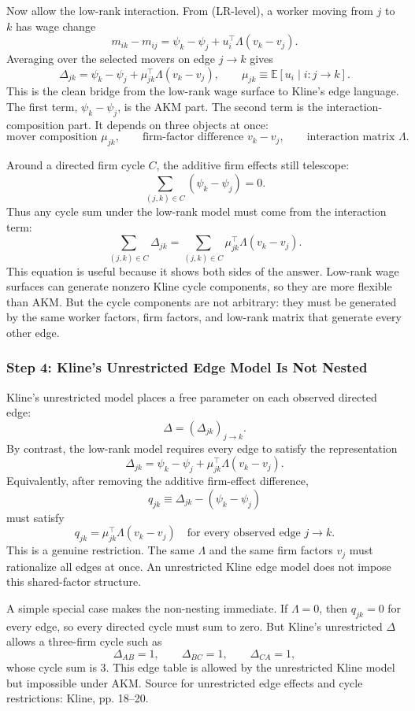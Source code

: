 ﻿\documentclass[11pt]{article}
\newcommand{\E}{\mathbb{E}}
\newcommand{\1}{\mathbf{1}}
\begin{document}
Now allow the low-rank interaction. From (LR-level), a worker moving from $j$ to
$k$ has wage change
\[
m_{ik}-m_{ij}
=
\psi_k-\psi_j+u_i^\top\Lambda(v_k-v_j).
\]
Averaging over the selected movers on edge $j\to k$ gives
\[
\Delta_{jk}
=
\psi_k-\psi_j+\mu_{jk}^\top\Lambda(v_k-v_j),
\qquad
\mu_{jk}\equiv \E[u_i\mid i:j\to k].
\tag{LR-edge}
\]
This is the clean bridge from the low-rank wage surface to Kline's edge language.
The first term, $\psi_k-\psi_j$, is the AKM part. The second term is the
interaction-composition part. It depends on three objects at once:
\[
\text{mover composition } \mu_{jk},
\qquad
\text{firm-factor difference } v_k-v_j,
\qquad
\text{interaction matrix } \Lambda.
\]

Around a directed firm cycle $C$, the additive firm effects still telescope:
\[
\sum_{(j,k)\in C}(\psi_k-\psi_j)=0.
\]
Thus any cycle sum under the low-rank model must come from the interaction term:
\[
\sum_{(j,k)\in C}\Delta_{jk}
=
\sum_{(j,k)\in C}\mu_{jk}^\top\Lambda(v_k-v_j).
\tag{LR-cycle}
\]
This equation is useful because it shows both sides of the answer. Low-rank wage
surfaces can generate nonzero Kline cycle components, so they are more flexible
than AKM. But the cycle components are not arbitrary: they must be generated by
the same worker factors, firm factors, and low-rank matrix that generate every
other edge.

\subsubsection{Step 4: Kline's Unrestricted Edge Model Is Not Nested}

Kline's unrestricted model places a free parameter on each observed directed
edge:
\[
\Delta=(\Delta_{jk})_{j\to k}.
\]
By contrast, the low-rank model requires every edge to satisfy the representation
\[
\Delta_{jk}
=
\psi_k-\psi_j+\mu_{jk}^\top\Lambda(v_k-v_j).
\]
Equivalently, after removing the additive firm-effect difference,
\[
q_{jk}
\equiv
\Delta_{jk}-(\psi_k-\psi_j)
\]
must satisfy
\[
q_{jk}=\mu_{jk}^\top\Lambda(v_k-v_j)
\quad\text{for every observed edge }j\to k.
\tag{restriction}
\]
This is a genuine restriction. The same $\Lambda$ and the same firm factors
$v_j$ must rationalize all edges at once. An unrestricted Kline edge model does
not impose this shared-factor structure.

A simple special case makes the non-nesting immediate. If $\Lambda=0$, then
$q_{jk}=0$ for every edge, so every directed cycle must sum to zero. But Kline's
unrestricted $\Delta$ allows a three-firm cycle such as
\[
\Delta_{AB}=1,\qquad \Delta_{BC}=1,\qquad \Delta_{CA}=1,
\]
whose cycle sum is $3$. This edge table is allowed by the unrestricted Kline
model but impossible under AKM. Source for unrestricted edge effects and cycle
restrictions: Kline, pp. 18--20.
\end{document}
